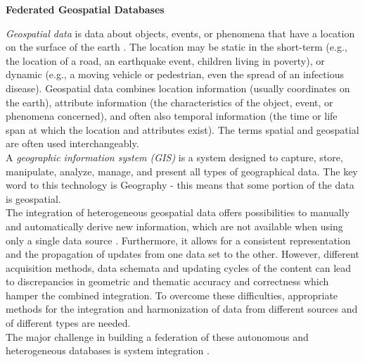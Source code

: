 \documentclass[12pt,a4paper]{report}
\newcommand{\term}{\textit}
\newcommand{\acr}{\MakeUppercase}
\begin{document}
	\begin{titlepage}
		\begin{center}
			\thispagestyle{empty}
			\Large
			\textbf{Federated Geospatial Databases}
		\end{center}
	\end{titlepage}




	\term{Geospatial data} is data about objects, events, or phenomena that have 
	a location on the surface of the earth \citep{Stock}. The location may be 
	static in the short-term (e.g., the location of a road, an earthquake event, children living in poverty), or dynamic (e.g., a moving vehicle or pedestrian, even the spread of an infectious disease). Geospatial data combines location information (usually coordinates on the earth), attribute information (the characteristics of the object, event, or phenomena concerned), and often also temporal information (the time or life span at which the location and attributes exist). The terms spatial and geospatial are often used interchangeably.
	\\

	A \term{geographic information system (\acr{gis})} is a system designed to capture, store, manipulate, analyze, manage, and present all types of geographical data. The key word to this technology is Geography - this means that some portion of the data is geospatial.
	\\




	The integration of heterogeneous geospatial data offers possibilities to manually and automatically derive new information, which are not available when using only a single data source \citep{Butenuth}. Furthermore, it allows for a consistent representation and the propagation of updates from one data set to the other. However, different acquisition methods, data schemata and updating cycles of the content can lead to discrepancies in geometric and thematic accuracy and correctness which hamper the combined integration. To overcome these difficulties, appropriate methods for the integration and harmonization of data from different sources and of different types are needed.
	\\

	The major challenge in building a federation of these autonomous and heterogeneous databases is system integration \citep{Malik}.
	\\
\end{document}
